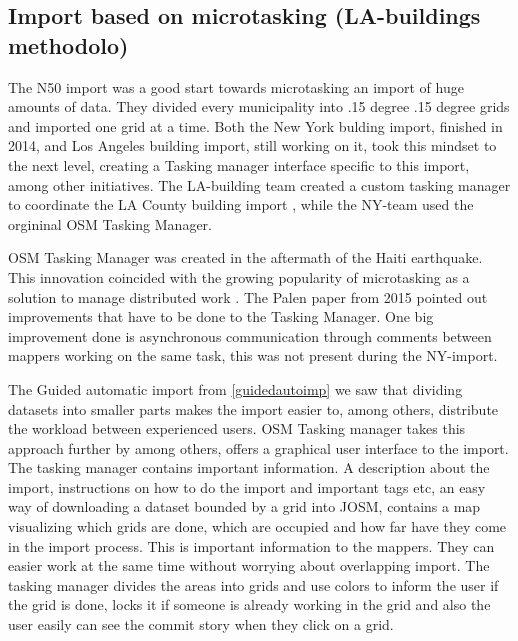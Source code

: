 \subsection{Import based on microtasking (LA-buildings methodolo)}
The N50 import was a good start towards microtasking an import of huge amounts of data. They divided every municipality into .15 degree .15 degree grids and imported one grid at a time. Both the New York bulding import, finished in 2014, and Los Angeles building import, still working on it, took this mindset to the next level, creating a Tasking manager interface specific to this import, among other initiatives. The LA-building team created a custom tasking manager to coordinate the LA County building import \cite{OSMTaskingManager}, while the NY-team used the orgininal OSM Tasking Manager. 

OSM Tasking Manager was created in the aftermath of the Haiti earthquake. This innovation coincided with the growing popularity of microtasking as a solution to manage distributed work \cite{Palen2015}. The Palen paper from 2015 pointed out improvements that have to be done to the Tasking Manager. One big improvement done is asynchronous communication through comments between mappers working on the same task, this was not present during the NY-import. 

The Guided automatic import from \ref{guidedautoimp} we saw that dividing datasets into smaller parts makes the import easier to, among others, distribute the workload between experienced users. OSM Tasking manager takes this approach further by among others, offers a graphical user interface to the import. The tasking manager contains important information. A description about the import, instructions on how to do the import and important tags etc, an easy way of downloading a dataset bounded by a grid into JOSM, contains a map visualizing which grids are done, which are occupied and how far have they come in the import process. This is important information to the mappers. They can easier work at the same time without worrying about overlapping import. The tasking manager divides the areas into grids and use colors to inform the user if the grid is done, locks it if someone is already working in the grid and also the user easily can see the commit story when they click on a grid. 

